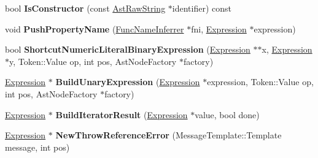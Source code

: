 \begin{DoxyCompactItemize}
\item 
bool {\bfseries Is\+Constructor} (const \hyperlink{classv8_1_1internal_1_1_ast_raw_string}{Ast\+Raw\+String} $\ast$identifier) const \hypertarget{classv8_1_1internal_1_1_parser_traits_a592da66d10de7c1f530bcc356f48326b}{}\label{classv8_1_1internal_1_1_parser_traits_a592da66d10de7c1f530bcc356f48326b}

\item 
void {\bfseries Push\+Property\+Name} (\hyperlink{classv8_1_1internal_1_1_func_name_inferrer}{Func\+Name\+Inferrer} $\ast$fni, \hyperlink{classv8_1_1internal_1_1_expression}{Expression} $\ast$expression)\hypertarget{classv8_1_1internal_1_1_parser_traits_a84e5b3ddf79722029810dcdd8c32e2a6}{}\label{classv8_1_1internal_1_1_parser_traits_a84e5b3ddf79722029810dcdd8c32e2a6}

\item 
bool {\bfseries Shortcut\+Numeric\+Literal\+Binary\+Expression} (\hyperlink{classv8_1_1internal_1_1_expression}{Expression} $\ast$$\ast$x, \hyperlink{classv8_1_1internal_1_1_expression}{Expression} $\ast$y, Token\+::\+Value op, int pos, Ast\+Node\+Factory $\ast$factory)\hypertarget{classv8_1_1internal_1_1_parser_traits_ad72a8bfdda3341d3ecd1e35274783e79}{}\label{classv8_1_1internal_1_1_parser_traits_ad72a8bfdda3341d3ecd1e35274783e79}

\item 
\hyperlink{classv8_1_1internal_1_1_expression}{Expression} $\ast$ {\bfseries Build\+Unary\+Expression} (\hyperlink{classv8_1_1internal_1_1_expression}{Expression} $\ast$expression, Token\+::\+Value op, int pos, Ast\+Node\+Factory $\ast$factory)\hypertarget{classv8_1_1internal_1_1_parser_traits_abef9a98716e76bfa90c80f453ac8169d}{}\label{classv8_1_1internal_1_1_parser_traits_abef9a98716e76bfa90c80f453ac8169d}

\item 
\hyperlink{classv8_1_1internal_1_1_expression}{Expression} $\ast$ {\bfseries Build\+Iterator\+Result} (\hyperlink{classv8_1_1internal_1_1_expression}{Expression} $\ast$value, bool done)\hypertarget{classv8_1_1internal_1_1_parser_traits_a5f817159b9b4b0b338a6af6ec9ec6f71}{}\label{classv8_1_1internal_1_1_parser_traits_a5f817159b9b4b0b338a6af6ec9ec6f71}

\item 
\hyperlink{classv8_1_1internal_1_1_expression}{Expression} $\ast$ {\bfseries New\+Throw\+Reference\+Error} (Message\+Template\+::\+Template message, int pos)\hypertarget{classv8_1_1internal_1_1_parser_traits_a355160b0c838b5a15aae94a85f7ed80e}{}\label{classv8_1_1internal_1_1_parser_traits_a355160b0c838b5a15aae94a85f7ed80e}


\end{DoxyCompactItemize}
